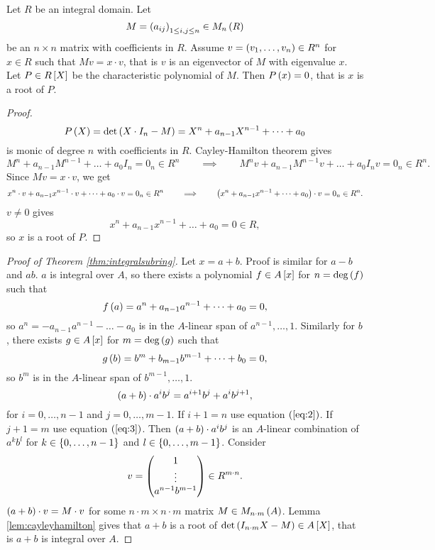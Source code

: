 \begin{lemma}
\label{lem:cayleyhamilton}
Let $ R $ be an integral domain. Let
$$ M = \rb{a_{ij}}_{1 \le i, j \le n} \in M_n\rb{R} $$
be an $ n \times n $ matrix with coefficients in $ R $. Assume $ v = \rb{v_1, \dots, v_n} \in R^n $ for $ x \in R $ such that $ Mv = x \cdot v $, that is $ v $ is an eigenvector of $ M $ with eigenvalue $ x $. Let $ P \in R\sb{X} $ be the characteristic polynomial of $ M $. Then $ P\rb{x} = 0 $, that is $ x $ is a root of $ P $.
\end{lemma}

\begin{proof}
$$ P\rb{X} = \det\rb{X \cdot I_n - M} = X^n + a_{n - 1}X^{n - 1} + \dots + a_0 $$
is monic of degree $ n $ with coefficients in $ R $. Cayley-Hamilton theorem gives
$$ M^n + a_{n - 1}M^{n - 1} + \dots + a_0I_n = 0_n \in R^n \qquad \implies \qquad M^nv + a_{n - 1}M^{n - 1}v + \dots + a_0I_nv = 0_n \in R^n. $$
Since $ Mv = x \cdot v $, we get
$$ x^n \cdot v + a_{n - 1}x^{n - 1} \cdot v + \dots + a_0 \cdot v = 0_n \in R^n \qquad \implies \qquad \rb{x^n + a_{n - 1}x^{n - 1} + \dots + a_0} \cdot v = 0_n \in R^n. $$
$ v \ne 0 $ gives
$$ x^n + a_{n - 1}x^{n - 1} + \dots + a_0 = 0 \in R, $$
so $ x $ is a root of $ P $.
\end{proof}

\begin{proof}[Proof of Theorem \ref{thm:integralsubring}]
Let $ x = a + b $. Proof is similar for $ a - b $ and $ ab $. $ a $ is integral over $ A $, so there exists a polynomial $ f \in A\sb{x} $ for $ n = \deg\rb{f} $ such that
\begin{equation}
\label{eq:2}
f\rb{a} = a^n + a_{n - 1}a^{n - 1} + \dots + a_0 = 0,
\end{equation}
so $ a^n = -a_{n - 1}a^{n - 1} - \dots - a_0 $ is in the $ A $-linear span of $ a^{n - 1}, \dots, 1 $. Similarly for $ b $, there exists $ g \in A\sb{x} $ for $ m = \deg\rb{g} $ such that
\begin{equation}
\label{eq:3}
g\rb{b} = b^m + b_{m - 1}b^{m - 1} + \dots + b_0 = 0,
\end{equation}
so $ b^m $ is in the $ A $-linear span of $ b^{m - 1}, \dots, 1 $.
$$ \rb{a + b} \cdot a^ib^j = a^{i + 1}b^j + a^ib^{j + 1}, $$
for $ i = 0, \dots, n - 1 $ and $ j = 0, \dots, m - 1 $. If $ i + 1 = n $ use equation $ \rb{\ref{eq:2}} $. If $ j + 1 = m $ use equation $ \rb{\ref{eq:3}} $. Then $ \rb{a + b} \cdot a^ib^j $ is an $ A $-linear combination of $ a^kb^l $ for $ k \in \cb{0, \dots, n - 1} $ and $ l \in \cb{0, \dots, m - 1} $. Consider
$$ v = \threebyone{1}{\vdots}{a^{n - 1}b^{m - 1}} \in R^{m \cdot n}. $$
$ \rb{a + b} \cdot v = M \cdot v $ for some $ n \cdot m \times n \cdot m $ matrix $ M \in M_{n \cdot m}\rb{A} $. Lemma \ref{lem:cayleyhamilton} gives that $ a + b $ is a root of $ \det\rb{I_{n \cdot m}X - M} \in A\sb{X} $, that is $ a + b $ is integral over $ A $.
\end{proof}

